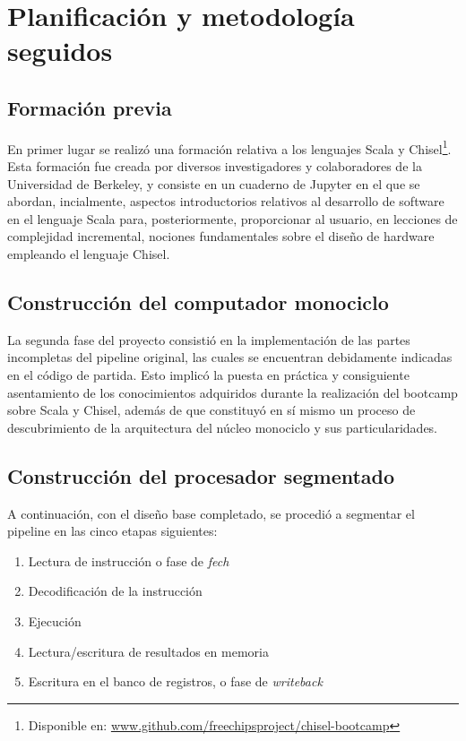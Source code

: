 \section{Planificación y metodología seguidos}

\subsection{Formación previa}

En primer lugar se realizó una formación relativa a los lenguajes Scala y Chisel\footnote{Disponible en: \url{www.github.com/freechipsproject/chisel-bootcamp}}. Esta formación fue creada por diversos investigadores y colaboradores de la Universidad de Berkeley, y consiste en un cuaderno de Jupyter en el que se abordan, incialmente, aspectos introductorios relativos al desarrollo de software en el lenguaje Scala para, posteriormente, proporcionar al usuario, en lecciones de complejidad incremental, nociones fundamentales sobre el diseño de hardware empleando el lenguaje Chisel.

\subsection{Construcción del computador monociclo}

La segunda fase del proyecto consistió en la implementación de las partes incompletas del pipeline original, las cuales se encuentran debidamente indicadas en el código de partida. Esto implicó la puesta en práctica y consiguiente asentamiento de los conocimientos adquiridos durante la realización del bootcamp sobre Scala y Chisel, además de que constituyó en sí mismo un proceso de descubrimiento de la arquitectura del núcleo monociclo y sus particularidades.

\subsection{Construcción del procesador segmentado}

A continuación, con el diseño base completado, se procedió a segmentar el pipeline en las cinco etapas siguientes:

\begin{enumerate}
  \item{Lectura de instrucción o fase de \textit{fech}}
  \item{Decodificación de la instrucción}
  \item{Ejecución}
  \item{Lectura/escritura de resultados en memoria}
  \item{Escritura en el banco de registros, o fase de \textit{writeback}}
\end{enumerate}

